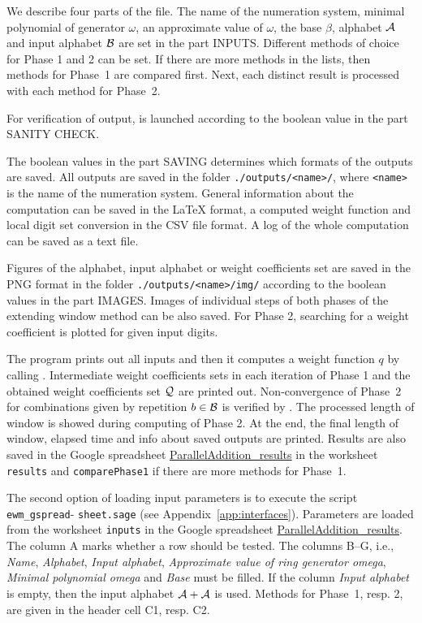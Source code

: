 We describe four parts of the file.
The name of the numeration system, minimal polynomial of generator $\omega$, an approximate value of $\omega$, the base $\beta$, alphabet $\mathcal{A}$ and input alphabet $\mathcal{B}$ are set in the part INPUTS. Different methods of choice for Phase 1 and 2 can be set. If there are more methods in the lists, then methods for Phase~1 are compared first. Next, each distinct result is processed with each method for Phase~2.  

For verification of output,  is launched according to the boolean value in the part SANITY CHECK. 

The boolean values in the part SAVING determines which formats of the outputs are saved. All outputs are saved in the folder \verb+./outputs/<name>/+, where \verb+<name>+ is the name of the numeration system. General information about the computation can be saved in the \LaTeX{} format, a computed weight function and local digit set conversion in the CSV file format.  A log of the whole computation can be saved as a text file.

Figures of the alphabet, input alphabet or weight coefficients set are saved in the PNG format in the folder \verb+./outputs/<name>/img/+ according to the boolean values in the part IMAGES. Images of individual steps of both phases of the extending window method can be also saved. For Phase 2, searching for a weight coefficient  is plotted for given input digits.  

The program prints out all inputs and then it computes a weight function $q$ by calling . Intermediate weight coefficients sets in each iteration of Phase 1 and the obtained weight coefficients set $\mathcal{Q}$ are printed out. Non-convergence of Phase~2 for combinations given by repetition $b\in\mathcal{B}$ is verified by . The processed length of window is showed during computing of Phase 2. At the end, the final length of window, elapsed time and info about saved outputs are printed. Results are also saved in the Google spreadsheet \href{https://docs.google.com/spreadsheets/d/1TnhrHdefHfHa0WSeVs4q6XVj3epjPlPlnoekE0E1xeM/edit?usp=sharing}{ParallelAddition\_results} in the worksheet \verb+results+ and \verb+comparePhase1+ if there are more methods for Phase~1.

The second option of loading input parameters is to execute the script \verb+ewm_gspread+- \verb+sheet.sage+ (see Appendix~\ref{app:interfaces}). Parameters are loaded from the worksheet \verb+inputs+ in the Google spreadsheet \href{https://docs.google.com/spreadsheets/d/1TnhrHdefHfHa0WSeVs4q6XVj3epjPlPlnoekE0E1xeM/edit?usp=sharing}{ParallelAddition\_results}. The column A marks whether a row should be tested. The columns B--G, i.e., \emph{Name}, \emph{Alphabet}, \emph{Input alphabet}, \emph{Approximate value of ring generator omega}, \emph{Minimal polynomial omega} and \emph{Base} must be filled. If the column \emph{Input alphabet} is empty, then the input alphabet $\mathcal{A}+\mathcal{A}$ is used. Methods for Phase~1, resp. 2, are given in the header cell C1, resp. C2.

